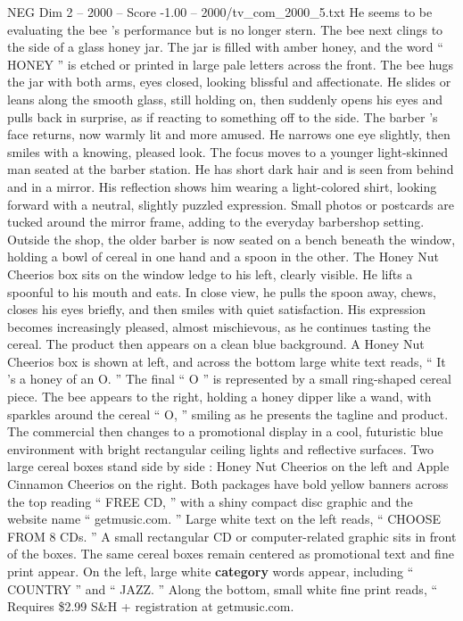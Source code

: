 \begin{textsample}{NEG Dim 2 – 2000 – Score -1.00 – 2000/tv\_com\_2000\_5.txt}
He seems to be evaluating the bee ’s performance but is no longer stern.
The bee next clings to the side of a glass honey jar.
The jar is filled with amber honey, and the word “ HONEY ” is etched or printed in large pale letters across the front.
The bee hugs the jar with both arms, eyes closed, looking blissful and affectionate.
He slides or leans along the smooth glass, still holding on, then suddenly opens his eyes and pulls back in surprise, as if reacting to something off to the side.
The barber ’s face returns, now warmly lit and more amused.
He narrows one eye slightly, then smiles with a knowing, pleased look.
The focus moves to a younger light-skinned man seated at the barber station.
He has short dark hair and is seen from behind and in a mirror.
His reflection shows him wearing a light-colored shirt, looking forward with a neutral, slightly puzzled expression.
Small photos or postcards are tucked around the mirror frame, adding to the everyday barbershop setting.
Outside the shop, the older barber is now seated on a bench beneath the window, holding a bowl of cereal in one hand and a spoon in the other.
The Honey Nut Cheerios box sits on the window ledge to his left, clearly visible.
He lifts a spoonful to his mouth and eats.
In close view, he pulls the spoon away, chews, closes his eyes briefly, and then smiles with quiet satisfaction.
His expression becomes increasingly pleased, almost mischievous, as he continues tasting the cereal.
The product then appears on a clean blue background.
A Honey Nut Cheerios box is shown at left, and across the bottom large white text reads, “ It ’s a honey of an O. ” The final “ O ” is represented by a small ring-shaped cereal piece.
The bee appears to the right, holding a honey dipper like a wand, with sparkles around the cereal “ O, ” smiling as he presents the tagline and product.
The commercial then changes to a promotional display in a cool, futuristic blue environment with bright rectangular ceiling lights and reflective surfaces.
Two large cereal boxes stand side by side : Honey Nut Cheerios on the left and Apple Cinnamon Cheerios on the right.
Both packages have bold yellow banners across the top reading “ FREE CD, ” with a shiny compact disc graphic and the website name “ getmusic.com. ” Large white text on the left reads, “ CHOOSE FROM 8 CDs. ” A small rectangular CD or computer-related graphic sits in front of the boxes.
The same cereal boxes remain centered as promotional text and fine print appear.
On the left, large white \textbf{category} words appear, including “ COUNTRY ” and “ JAZZ. ” Along the bottom, small white fine print reads, “ Requires \$2.99 S\&H + registration at getmusic.com.

\end{textsample}
